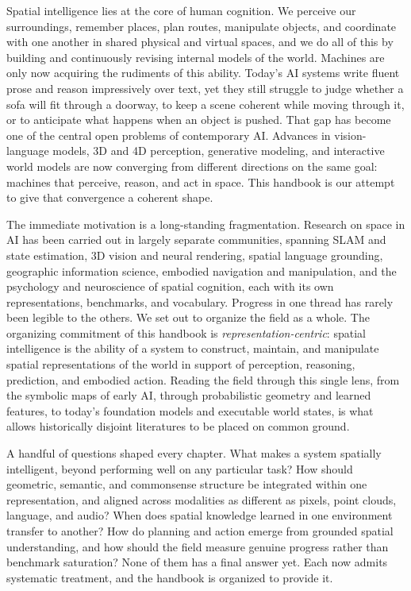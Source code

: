 Spatial intelligence lies at the core of human cognition.
We perceive our surroundings, remember places, plan routes, manipulate objects, and coordinate with one another in shared physical and virtual spaces, and we do all of this by building and continuously revising internal models of the world.
Machines are only now acquiring the rudiments of this ability.
Today's AI systems write fluent prose and reason impressively over text, yet they still struggle to judge whether a sofa will fit through a doorway, to keep a scene coherent while moving through it, or to anticipate what happens when an object is pushed.
That gap has become one of the central open problems of contemporary AI.
Advances in vision-language models, 3D and 4D perception, generative modeling, and interactive world models are now converging from different directions on the same goal: machines that perceive, reason, and act in space.
This handbook is our attempt to give that convergence a coherent shape.

The immediate motivation is a long-standing fragmentation.
Research on space in AI has been carried out in largely separate communities, spanning SLAM and state estimation, 3D vision and neural rendering, spatial language grounding, geographic information science, embodied navigation and manipulation, and the psychology and neuroscience of spatial cognition, each with its own representations, benchmarks, and vocabulary.
Progress in one thread has rarely been legible to the others.
We set out to organize the field as a whole.
The organizing commitment of this handbook is \emph{representation-centric}: spatial intelligence is the ability of a system to construct, maintain, and manipulate spatial representations of the world in support of perception, reasoning, prediction, and embodied action.
Reading the field through this single lens, from the symbolic maps of early AI, through probabilistic geometry and learned features, to today's foundation models and executable world states, is what allows historically disjoint literatures to be placed on common ground.

A handful of questions shaped every chapter.
What makes a system spatially intelligent, beyond performing well on any particular task?
How should geometric, semantic, and commonsense structure be integrated within one representation, and aligned across modalities as different as pixels, point clouds, language, and audio?
When does spatial knowledge learned in one environment transfer to another?
How do planning and action emerge from grounded spatial understanding, and how should the field measure genuine progress rather than benchmark saturation?
None of them has a final answer yet.
Each now admits systematic treatment, and the handbook is organized to provide it.

